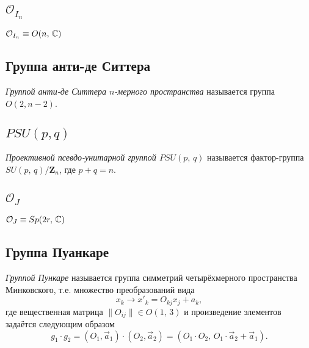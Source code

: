 \documentclass[a4paper,12pt]{article}
\begin{document}
\subsection{$\mathcal{O}_{I_n}$ }
$\mathcal{O}_{I_n} \equiv O(n,\,\mathbb{C})$
\subsection{Группа анти-де Ситтера}
\begin{dfn}
	\emph{Группой анти-де Ситтера $n$-мерного пространства} называется
	группа $O(2,n-2)$.
\end{dfn}
\subsection{$PSU(p, q)$ }
\begin{dfn}
	\emph{Проективной псевдо-унитарной группой $PSU(p,\,q)$} называется
	фактор-группа $SU(p,\,q) / \mathbf{Z}_n$, где  $p+q=n$.
\end{dfn}
\subsection{$\mathcal{O}_{J}$ }
$\mathcal{O}_{J} \equiv Sp(2r,\, \mathbb{C})$ 
\subsection{Группа Пуанкаре}
\begin{dfn}
	\emph{Группой Пункаре} называется группа симметрий четырёхмерного
	пространства Минковского, т.е. множество преобразований вида
	\begin{equation}
 		x_k \to x'_k = O_{kj}x_j+a_k
 	,\end{equation}
 	где вещественная матрица $\|O_{ij}\| \in O(1,\,3)$ и произведение
 	элементов задаётся следующим образом
 	\begin{equation}
 		g_1 \cdot g_2 = (O_1, \vec{a}_1) \cdot  (O_2, \vec{a}_2) =
 		(O_1 \cdot O_2,\, O_1 \cdot \vec{a}_2 + \vec{a}_1)
 	.\end{equation}
\end{dfn}
\end{document}
